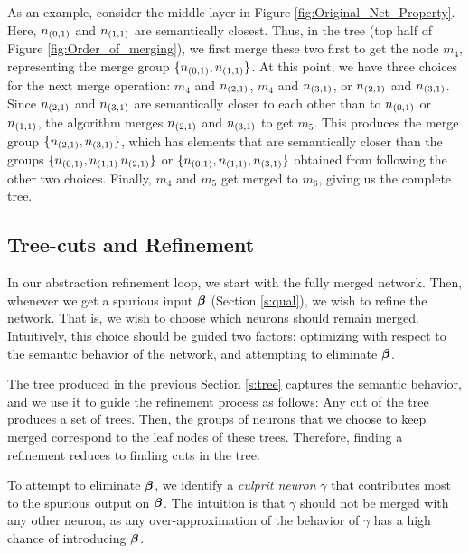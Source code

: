 As an example, consider the middle layer in Figure
\ref{fig:Original_Net_Property}. Here, $n_{(0,1)}$ and $n_{(1,1)}$ are
semantically closest. Thus, in the tree (top half of Figure
\ref{fig:Order_of_merging}), we first merge these two first to get the
node $m_4$, representing the merge group $\{n_{(0,1)}, n_{(1,1)}\}$. At this
point, we have three choices for the next merge operation: $m_4$ and
$n_{(2,1)}$, $m_4$ and $n_{(3,1)}$, or $n_{(2,1)}$ and $n_{(3,1)}$. Since
$n_{(2,1)}$ and $n_{(3,1)}$ are semantically closer to each other than to
$n_{(0,1)}$ or $n_{(1,1)}$, the algorithm merges
$n_{(2,1)}$ and $n_{(3,1)}$ to get $m_5$. This produces the merge group
$\{n_{(2,1)}, n_{(3,1)}\}$, which has elements that are semantically closer than
the groups $\{n_{(0,1)}, n_{(1,1)}\, n_{(2,1)}\}$ or $\{n_{(0,1)}, n_{(1,1)},
n_{(3,1)} \}$ obtained from following the other two choices. 
Finally, $m_4$ and $m_5$ get merged to $m_6$, giving us the complete tree.

\subsection{Tree-cuts and Refinement}
\label{s:refinement}



In our abstraction refinement loop, we start with the fully merged network.
Then, whenever we get a spurious input $\boldsymbol{\beta}$ (Section \ref{s:qual}), we
wish to refine the network. That is, we wish to choose which
neurons should remain merged. Intuitively, this choice should be guided
two factors: optimizing with respect to the semantic behavior of the network,
and attempting to eliminate $\boldsymbol{\beta}$. 

The tree produced in the previous Section \ref{s:tree} captures the semantic
behavior, and we use it to guide the refinement process as follows:
Any cut of the tree produces a set of trees. Then,  
the groups of neurons that we choose to keep merged correspond to the leaf nodes
of these trees. Therefore, finding a refinement reduces to finding cuts
in the tree.

To attempt to eliminate $\boldsymbol{\beta}$, we identify a \textit{culprit neuron}
$\gamma$ that contributes most to the spurious output on $\boldsymbol{\beta}$. The
intuition is that $\gamma$ should not be merged with any other neuron, as any
over-approximation of the behavior of $\gamma$ has a high chance of
introducing $\boldsymbol{\beta}$.

